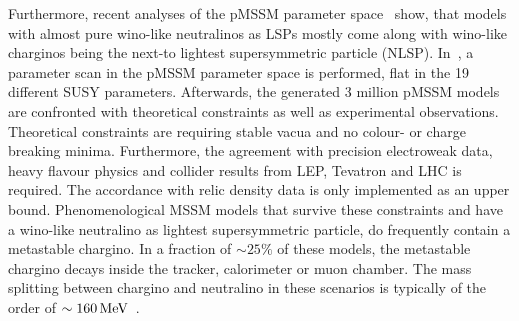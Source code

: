 

Furthermore, recent analyses of the pMSSM parameter space~\cite{bib:pMSSMScan_2013,bib:pMSSMScan_2012} show, that models with almost pure wino-like neutralinos as LSPs mostly come along with wino-like charginos being the next-to lightest supersymmetric particle (NLSP).
In~\cite{bib:pMSSMScan_2013}, a parameter scan in the pMSSM parameter space is performed, flat in the 19 different SUSY parameters.
Afterwards, the generated 3 million pMSSM models are confronted with theoretical constraints as well as experimental observations.
Theoretical constraints are \eg requiring stable vacua and no colour- or charge breaking minima.
Furthermore, the agreement with precision electroweak data, heavy flavour physics and collider results from LEP, Tevatron and LHC is required.
The accordance with relic density data is only implemented as an upper bound.
Phenomenological MSSM models that survive these constraints and have a wino-like neutralino as lightest supersymmetric particle, do frequently contain  a metastable chargino.
In a fraction of $\sim 25\%$ of these models, the metastable chargino decays inside the tracker, calorimeter or muon chamber.
The mass splitting between chargino and neutralino in these scenarios is typically of the order of $\sim160\,\text{Me}\kern-0.06667em\text{V}$~\cite{bib:pMSSMScan_2013}.



